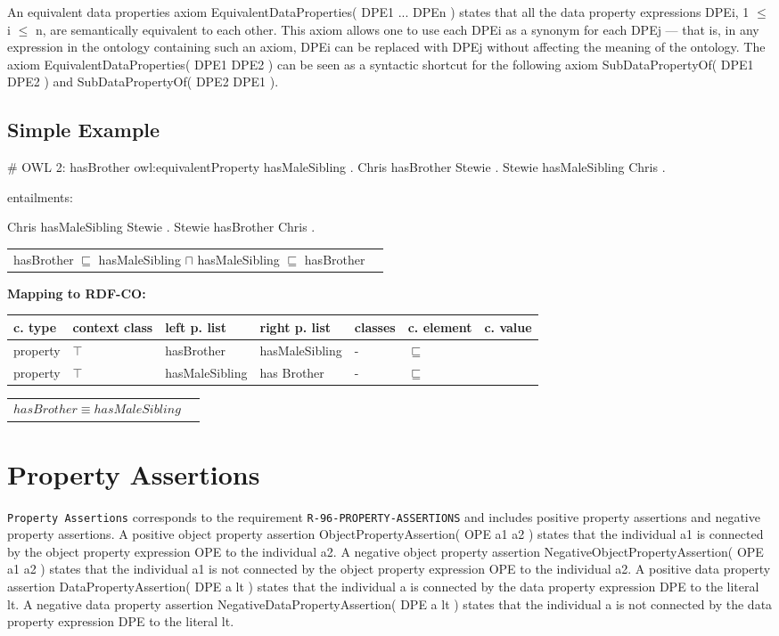 \documentclass{llncs}
\newcommand{\ms}[1]{\texttt{#1}}
\newenvironment{gcotable}{
  \scriptsize
  \sffamily
  \vspace{0cm}
	\begin{center}
	\textbf{\vspace{0.4cm}Mapping to RDF-CO:} \\
  \begin{tabular}{l|l|l|l|l|l|l}
	\hline
  \textbf{c. type} & \textbf{context class} & \textbf{left p. list} & \textbf{right p. list} & \textbf{classes} & \textbf{c. element} & \textbf{c. value} \\
  \hline

}{
  \hline
  \end{tabular}
	\end{center}
}
\newenvironment{DL}{
  \vspace{0cm}
	\begin{center}
  \begin{tabular}{r l}

}{
  \end{tabular}
	\end{center}
}
\begin{document}
An equivalent data properties axiom EquivalentDataProperties( DPE1 ... DPEn ) states that all the data property expressions DPEi, 1 $\leq$ i $\leq$ n, are semantically equivalent to each other. This axiom allows one to use each DPEi as a synonym for each DPEj — that is, in any expression in the ontology containing such an axiom, DPEi can be replaced with DPEj without affecting the meaning of the ontology. The axiom EquivalentDataProperties( DPE1 DPE2 ) can be seen as a syntactic shortcut for the following axiom SubDataPropertyOf( DPE1 DPE2 ) and SubDataPropertyOf( DPE2 DPE1 ).

\subsection{Simple Example}

\begin{ex}
# OWL 2:
hasBrother owl:equivalentProperty hasMaleSibling . 
Chris hasBrother Stewie . 
Stewie hasMaleSibling Chris .
\end{ex}

entailments:

\begin{ex}
Chris hasMaleSibling Stewie . 
Stewie hasBrother Chris .
\end{ex}

\begin{DL}
hasBrother $\sqsubseteq$ hasMaleSibling $\sqcap$ hasMaleSibling $\sqsubseteq$ hasBrother \\
\end{DL}

\begin{gcotable}
property & $\top$ & hasBrother & hasMaleSibling & - & $\sqsubseteq$ \\
property & $\top$ & hasMaleSibling & has Brother & - & $\sqsubseteq$ \\
\end{gcotable}

\begin{DL}
$hasBrother \equiv hasMaleSibling$
\end{DL}

\section{Property Assertions}

\ms{{Property Assertions}} corresponds to the requirement \ms{R-96-PROPERTY-ASSERTIONS}
and includes positive property assertions and negative property assertions.
A positive object property assertion ObjectPropertyAssertion( OPE a1 a2 ) states that the individual a1 is connected by the object property expression OPE to the individual a2. 
A negative object property assertion NegativeObjectPropertyAssertion( OPE a1 a2 ) states that the individual a1 is not connected by the object property expression OPE to the individual a2. 
A positive data property assertion DataPropertyAssertion( DPE a lt ) states that the individual a is connected by the data property expression DPE to the literal lt. 
A negative data property assertion NegativeDataPropertyAssertion( DPE a lt ) states that the individual a is not connected by the data property expression DPE to the literal lt.
\end{document}
